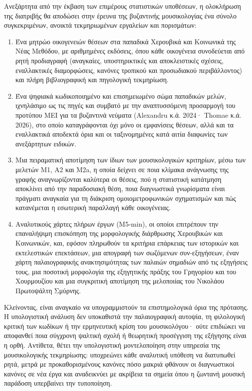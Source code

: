 \documentclass[11pt,a4paper]{article}
\begin{document}
Ανεξάρτητα από την έκβαση των επιμέρους στατιστικών υποθέσεων, η ολοκλήρωση της διατριβής θα αποδώσει στην έρευνα της βυζαντινής μουσικολογίας ένα σύνολο συγκεκριμένων, ανοικτά τεκμηριωμένων εργαλείων και πορισμάτων:
\begin{enumerate}
\item Ένα μητρώο οικογενειών θέσεων στα παπαδικά Χερουβικά και Κοινωνικά της Νέας Μεθόδου, με αριθμημένες εκδόσεις, όπου κάθε οικογένεια συνοδεύεται από ρητή προδιαγραφή (αναγκαίες, υποστηρικτικές και αποκλειστικές σχέσεις, εναλλακτικές διαμορφώσεις, κανόνες τροπικού και προσωδιακού περιβάλλοντος) και πλήρη βιβλιογραφική και πηγολογική τεκμηρίωση.
\item Ένα ψηφιακά κωδικοποιημένο και επισημειωμένο σώμα παπαδικών μελών, ιχνηλάσιμο ως τις πηγές και συμβατό με την αναπτυσσόμενη προσαρμογή του προτύπου MEI για τα βυζαντινά νεύματα (Alexandru κ.ά. 2024· Thomae κ.ά. 2026), στο οποίο καταγράφονται όχι μόνο οι εμφανίσεις θέσεων, αλλά και τα εναλλακτικά αποδεκτά όρια και οι ταξινομημένες κατά αιτία διαφωνίες των ανεξάρτητων ειδικών.
\item Μια πειραματική αποτίμηση των ίδιων των μουσικολογικών κριτηρίων, μέσω των μελετών Μ1, Α2 και Μ2a, η οποία δείχνει σε ποια κλίμακα ανάγνωσης της γραφής αναγνωρίζονται καλύτερα οι θέσεις, πού η στατιστική κατάτμηση αποκλίνει από την παραδοσιακή θέση, ποια διαγνωστικά γνωρίσματα είναι πράγματι αναγκαία για τη διάκριση ομοιομετροφωνικών σχηματισμών και πώς κατανέμεται η εσωτερική παραλλαγή κάθε οικογένειας.
\item Αναλυτικούς χάρτες πλήρων έργων (Μ5-min), οι οποίοι επιτρέπουν την επαναλήψιμη επισκόπηση της μορφολογικής διάρθρωσης Χερουβικών και Κοινωνικών, και, εφόσον πληρωθούν τα κριτήρια επάρκειας των ιστορικών και εκτελεστικών επεκτάσεων, μια απογραφή των σωζόμενων συν-εξηγήσεων, έναν χάρτη παλαιογραφικής ανακτησιμότητας των παλαιών σημαδιών από τις εξηγήσεις τους, μια ποσοτική μορφολογία της εξηγητικής πράξης του Γρηγορίου και του Χουρμουζίου και μια συγκριτική αποτίμηση της μελοποιίας του Νικολάου Πρωτοψάλτη Σμύρνης.
\end{enumerate}

Κλείνοντας, είναι αναγκαίο να υπογραμμιστούν τα επιστημολογικά όρια της πρότασης. Η υπολογιστική ανάλυση δεν υποκαθιστά την παλαιογραφική αυτοψία, τη φιλολογική κριτική των κωδίκων ή την ερμηνευτική κρίση του μουσικολόγου· ούτε επιδιώκει να αποφανθεί ποια σύγχρονη ψαλτική σχολή ή θεωρητική προσέγγιση της εξήγησης είναι η ορθή. Αντίθετα, θέτει την υπολογιστική μοντελοποίηση στην υπηρεσία της μουσικολογικής τεκμηρίωσης: υποχρεώνει κάθε αναλυτική υπόθεση να διατυπωθεί ρητά, μετρά με προκαθορισμένους κανόνες πόσο μακριά φθάνουν οι διαγνωστικοί κανόνες σε νέα έργα και αναδεικνύει με ακρίβεια τα σημεία όπου η ζωντανή μουσική παράδοση υπερβαίνει την τυποποίηση.
\end{document}
